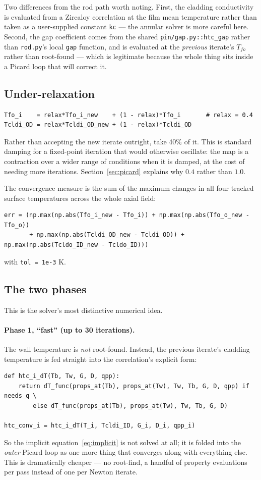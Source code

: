 \documentclass[11pt]{article}
\newcommand{\code}[1]{\texttt{#1}}
\begin{document}
Two differences from the rod path worth noting. First, the cladding conductivity is
evaluated from a Zircaloy correlation at the film mean temperature rather than taken as
a user-supplied constant \code{kc} --- the annular solver is more careful here. Second,
the gap coefficient comes from the shared \code{pin/gap.py::htc\_gap} rather than
\code{rod.py}'s local \code{gap} function, and is evaluated at the \emph{previous}
iterate's $T_{fo}$ rather than root-found --- which is legitimate because the whole thing
sits inside a Picard loop that will correct it.

\subsection{Under-relaxation}
\begin{lstlisting}
Tfo_i    = relax*Tfo_i_new    + (1 - relax)*Tfo_i       # relax = 0.4
Tcldi_OD = relax*Tcldi_OD_new + (1 - relax)*Tcldi_OD
\end{lstlisting}

Rather than accepting the new iterate outright, take 40\% of it. This is standard damping
for a fixed-point iteration that would otherwise oscillate: the map is a contraction over
a wider range of conditions when it is damped, at the cost of needing more iterations.
Section~\ref{sec:picard} explains why $0.4$ rather than $1.0$.

The convergence measure is the sum of the maximum changes in all four tracked surface
temperatures across the whole axial field:
\begin{lstlisting}
err = (np.max(np.abs(Tfo_i_new - Tfo_i)) + np.max(np.abs(Tfo_o_new - Tfo_o))
       + np.max(np.abs(Tcldi_OD_new - Tcldi_OD)) + np.max(np.abs(Tcldo_ID_new - Tcldo_ID)))
\end{lstlisting}
with \code{tol = 1e-3} K.

\subsection{The two phases}
\label{sec:twophaseclosure}

This is the solver's most distinctive numerical idea.

\paragraph{Phase 1, ``fast'' (up to 30 iterations).} The wall temperature is \emph{not}
root-found. Instead, the previous iterate's cladding temperature is fed straight into the
correlation's explicit form:
\begin{lstlisting}
def htc_i_dT(Tb, Tw, G, D, qpp):
    return dT_func(props_at(Tb), props_at(Tw), Tw, Tb, G, D, qpp) if needs_q \
        else dT_func(props_at(Tb), props_at(Tw), Tw, Tb, G, D)

htc_conv_i = htc_i_dT(T_i, Tcldi_ID, G_i, D_i, qpp_i)
\end{lstlisting}
So the implicit equation~\eqref{eq:implicit} is not solved at all; it is folded into the
\emph{outer} Picard loop as one more thing that converges along with everything else.
This is dramatically cheaper --- no root-find, a handful of property evaluations per pass
instead of one per Newton iterate.
\end{document}
